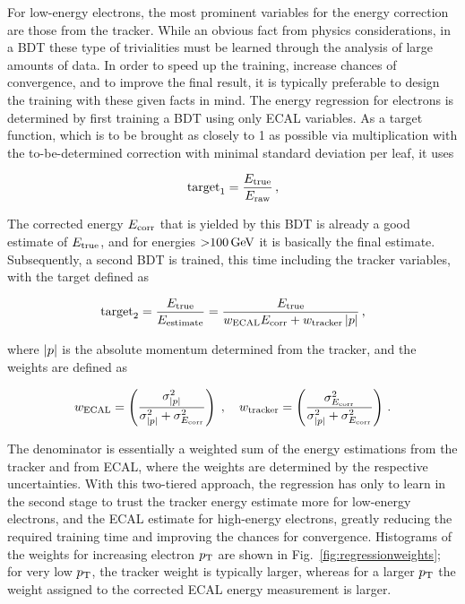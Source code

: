 For low-energy electrons, the most prominent variables for the energy correction are those from the tracker.
% 
While an obvious fact from physics considerations, in a BDT these type of trivialities must be learned through the analysis of large amounts of data.
% 
In order to speed up the training, increase chances of convergence, and to improve the final result, it is typically preferable to design the training with these given facts in mind.
% 
The energy regression for electrons is determined by first training a BDT using only ECAL variables.
%
As a target function, which is to be brought as closely to 1 as possible via multiplication with the to-be-determined correction with minimal standard deviation per leaf, it uses
% 
\begin{linenomath*}
\begin{equation}
\text{target}_1 = \frac{E_\text{true}}{E_\text{raw}}
\,,
\end{equation}
\end{linenomath*}
% 
The corrected energy $E_\text{corr}$ that is yielded by this BDT is already a good estimate of $E_\text{true}$, and for energies ${>}100\,\text{GeV}$ it is basically the final estimate.
% 
Subsequently, a second BDT is trained, this time including the tracker variables, with the target defined as
% 
\begin{linenomath*}
\begin{equation}
\text{target}_2 = 
% 
\frac{\Etrue}{E_\text{estimate}} =
% 
\frac{\Etrue}{ w_\text{ECAL} \Ecorr + w_\text{tracker} \abs{p} }
\,,
\end{equation}
\end{linenomath*}
% 
where $\left| p \right |$ is the absolute momentum determined from the tracker, and the weights are defined as
% 
\begin{linenomath*}
\begin{equation}
w_\text{ECAL} = \left( \frac{\sigma^2_{\left| p \right |}}{\sigma^2_{\left| p \right |} + \sigma^2_{E_\text{corr}}} \right)
\;,\quad
w_\text{tracker} = \left( \frac{\sigma^2_{E_\text{corr}}}{\sigma^2_{\left| p \right |} + \sigma^2_{E_\text{corr}}} \right)
\,.
\end{equation}
\end{linenomath*}
% 
The denominator is essentially a weighted sum of the energy estimations from the tracker and from ECAL, where the weights are determined by the respective uncertainties.
% 
With this two-tiered approach, the regression has only to learn in the second stage to trust the tracker energy estimate more for low-energy electrons, and the ECAL estimate for high-energy electrons, greatly reducing the required training time and improving the chances for convergence.
% 
Histograms of the weights for increasing electron $p_\mathrm{T}$ are shown in Fig.~\ref{fig:regressionweights}; for very low $p_\mathrm{T}$, the tracker weight is typically larger, whereas for a larger $p_\mathrm{T}$ the weight assigned to the corrected ECAL energy measurement is larger.


